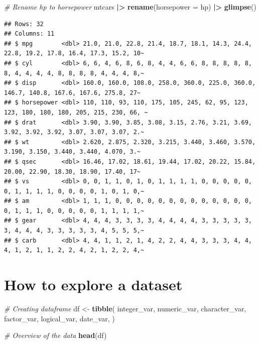 \documentclass[
  12pt,
  oneside]{book}
\newenvironment{Shaded}{\begin{snugshade}}{\end{snugshade}}
\newcommand{\AttributeTok}[1]{\textcolor[rgb]{0.13,0.29,0.53}{#1}}
\newcommand{\CommentTok}[1]{\textcolor[rgb]{0.56,0.35,0.01}{\textit{#1}}}
\newcommand{\FunctionTok}[1]{\textcolor[rgb]{0.13,0.29,0.53}{\textbf{#1}}}
\newcommand{\NormalTok}[1]{#1}
\newcommand{\OtherTok}[1]{\textcolor[rgb]{0.56,0.35,0.01}{#1}}
\newcommand{\SpecialCharTok}[1]{\textcolor[rgb]{0.81,0.36,0.00}{\textbf{#1}}}
\begin{document}
\begin{Shaded}
\begin{Highlighting}[]
\CommentTok{\# Rename hp to horsepower}
\NormalTok{mtcars }\SpecialCharTok{|\textgreater{}} 
  \FunctionTok{rename}\NormalTok{(}\AttributeTok{horsepower =}\NormalTok{ hp) }\SpecialCharTok{|\textgreater{}} 
  \FunctionTok{glimpse}\NormalTok{()}
\end{Highlighting}
\end{Shaded}

\begin{verbatim}
## Rows: 32
## Columns: 11
## $ mpg        <dbl> 21.0, 21.0, 22.8, 21.4, 18.7, 18.1, 14.3, 24.4, 22.8, 19.2, 17.8, 16.4, 17.3, 15.2, 10~
## $ cyl        <dbl> 6, 6, 4, 6, 8, 6, 8, 4, 4, 6, 6, 8, 8, 8, 8, 8, 8, 4, 4, 4, 4, 8, 8, 8, 8, 4, 4, 4, 8,~
## $ disp       <dbl> 160.0, 160.0, 108.0, 258.0, 360.0, 225.0, 360.0, 146.7, 140.8, 167.6, 167.6, 275.8, 27~
## $ horsepower <dbl> 110, 110, 93, 110, 175, 105, 245, 62, 95, 123, 123, 180, 180, 180, 205, 215, 230, 66, ~
## $ drat       <dbl> 3.90, 3.90, 3.85, 3.08, 3.15, 2.76, 3.21, 3.69, 3.92, 3.92, 3.92, 3.07, 3.07, 3.07, 2.~
## $ wt         <dbl> 2.620, 2.875, 2.320, 3.215, 3.440, 3.460, 3.570, 3.190, 3.150, 3.440, 3.440, 4.070, 3.~
## $ qsec       <dbl> 16.46, 17.02, 18.61, 19.44, 17.02, 20.22, 15.84, 20.00, 22.90, 18.30, 18.90, 17.40, 17~
## $ vs         <dbl> 0, 0, 1, 1, 0, 1, 0, 1, 1, 1, 1, 0, 0, 0, 0, 0, 0, 1, 1, 1, 1, 0, 0, 0, 0, 1, 0, 1, 0,~
## $ am         <dbl> 1, 1, 1, 0, 0, 0, 0, 0, 0, 0, 0, 0, 0, 0, 0, 0, 0, 1, 1, 1, 0, 0, 0, 0, 0, 1, 1, 1, 1,~
## $ gear       <dbl> 4, 4, 4, 3, 3, 3, 3, 4, 4, 4, 4, 3, 3, 3, 3, 3, 3, 4, 4, 4, 3, 3, 3, 3, 3, 4, 5, 5, 5,~
## $ carb       <dbl> 4, 4, 1, 1, 2, 1, 4, 2, 2, 4, 4, 3, 3, 3, 4, 4, 4, 1, 2, 1, 1, 2, 2, 4, 2, 1, 2, 2, 4,~
\end{verbatim}

\hypertarget{how-to-explore-a-dataset}{%
\section{How to explore a dataset}\label{how-to-explore-a-dataset}}

\begin{Shaded}
\begin{Highlighting}[]
\CommentTok{\# Creating dataframe}
\NormalTok{df }\OtherTok{\textless{}{-}} \FunctionTok{tibble}\NormalTok{(}
\NormalTok{  integer\_var, numeric\_var, character\_var, factor\_var, logical\_var, date\_var,}
\NormalTok{)}

\CommentTok{\# Overview of the data}
\FunctionTok{head}\NormalTok{(df)}
\end{Highlighting}
\end{Shaded}
\end{document}
